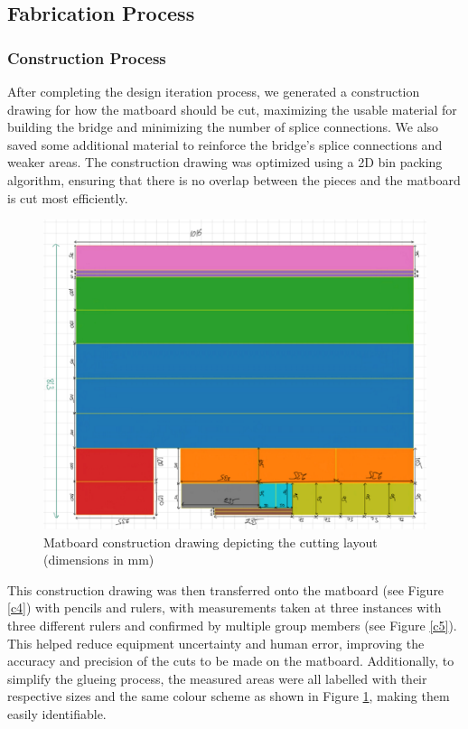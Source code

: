 \documentclass[11pt]{article}
\begin{document}
\subsection{Fabrication Process}

\subsubsection{Construction Process}

After completing the design iteration process, we generated a construction drawing for how the matboard should be cut, maximizing the usable material for building the bridge and minimizing the number of splice connections. We also saved some additional material to reinforce the bridge's splice connections and weaker areas. The construction drawing was optimized using a 2D bin packing algorithm, ensuring that there is no overlap between the pieces and the matboard is cut most efficiently.

\begin{figure}[h]
    \centering
    \includegraphics[width=.7\linewidth]{img/construction_3.png}
    \caption{Matboard construction drawing depicting the cutting layout (dimensions in mm)}
    \label{c3}
\end{figure}

This construction drawing was then transferred onto the matboard (see Figure \ref{c4}) with pencils and rulers, with measurements taken at three instances with three different rulers and confirmed by multiple group members (see Figure \ref{c5}). This helped reduce equipment uncertainty and human error, improving the accuracy and precision of the cuts to be made on the matboard. Additionally, to simplify the glueing process, the measured areas were all labelled with their respective sizes and the same colour scheme as shown in Figure \ref{c3}, making them easily identifiable.
\end{document}
